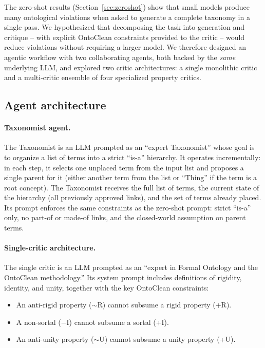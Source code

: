 \documentclass{IOS-Book-Article}
\begin{document}
The zero-shot results (Section~\ref{sec:zeroshot}) show that small
models produce many ontological violations when asked to generate a
complete taxonomy in a single pass.  We hypothesized that decomposing
the task into generation and critique -- with explicit OntoClean
constraints provided to the critic -- would reduce violations without
requiring a larger model.  We therefore designed an agentic workflow
with two collaborating agents, both backed by the \emph{same}
underlying LLM, and explored two critic architectures: a single
monolithic critic and a multi-critic ensemble of four specialized
property critics.

\subsection{Agent architecture}

\paragraph{Taxonomist agent.}
The Taxonomist is an LLM prompted as an ``expert Taxonomist'' whose
goal is to organize a list of terms into a strict ``is-a'' hierarchy.
It operates incrementally: in each step, it selects one unplaced term
from the input list and proposes a single parent for it (either another
term from the list or ``Thing'' if the term is a root concept).  The
Taxonomist receives the full list of terms, the current state of the
hierarchy (all previously approved links), and the set of terms
already placed.  Its prompt enforces the same constraints as the
zero-shot prompt: strict ``is-a'' only, no part-of or made-of links,
and the closed-world assumption on parent terms.

\paragraph{Single-critic architecture.}
The single critic is an LLM prompted as an ``expert in Formal
Ontology and the OntoClean methodology.''  Its system prompt includes
definitions of rigidity, identity, and unity, together with the key
OntoClean constraints:

\begin{itemize}
\item An anti-rigid property ($\sim$R) cannot subsume a rigid property
  (+R).
\item A non-sortal ($-$I) cannot subsume a sortal (+I).
\item An anti-unity property ($\sim$U) cannot subsume a unity property
  (+U).
\end{itemize}
\end{document}
